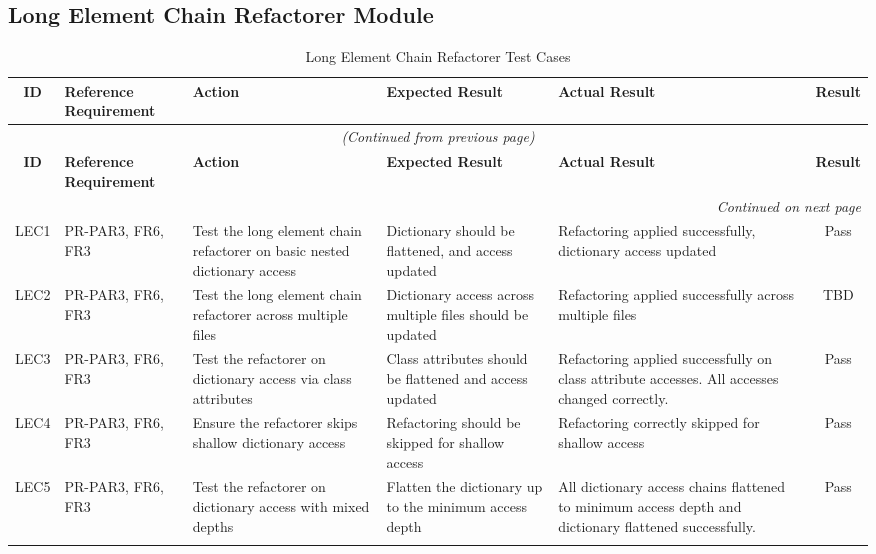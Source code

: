 \documentclass[12pt, titlepage]{article}
\begin{document}
\subsection{Long Element Chain Refactorer Module}

\begin{longtable}{|c|p{2.5cm}|p{3cm}|p{4cm}|p{2.5cm}|c|}
\hline
\textbf{ID} & \textbf{Reference Requirement} & \textbf{Action} & \textbf{Expected Result} & \textbf{Actual Result} & \textbf{Result} \\ \hline
\endfirsthead

\multicolumn{6}{c}{\textit{(Continued from previous page)}} \\ \hline
\textbf{ID} & \textbf{Reference Requirement} & \textbf{Action} & \textbf{Expected Result} & \textbf{Actual Result} & \textbf{Result} \\ \hline
\endhead

\hline \multicolumn{6}{|r|}{\textit{Continued on next page}} \\ \hline
\endfoot

\hline
\endlastfoot

LEC1 & PR-PAR3, FR6, FR3 & Test the long element chain refactorer on basic nested dictionary access & Dictionary should be flattened, and access updated & Refactoring applied successfully, dictionary access updated & \cellcolor{green!20} Pass \\ \hline
LEC2 & PR-PAR3, FR6, FR3 & Test the long element chain refactorer across multiple files & Dictionary access across multiple files should be updated & Refactoring applied successfully across multiple files & \cellcolor{yellow!20} TBD \\ \hline
LEC3 & PR-PAR3, FR6, FR3 & Test the refactorer on dictionary access via class attributes & Class attributes should be flattened and access updated & Refactoring applied successfully on class attribute accesses. All accesses changed correctly. & \cellcolor{green!20} Pass \\ \hline
LEC4 & PR-PAR3, FR6, FR3 & Ensure the refactorer skips shallow dictionary access & Refactoring should be skipped for shallow access & Refactoring correctly skipped for shallow access & \cellcolor{green!20} Pass \\ \hline
LEC5 & PR-PAR3, FR6, FR3 & Test the refactorer on dictionary access with mixed depths & Flatten the dictionary up to the minimum access depth & All dictionary access chains flattened to minimum access depth and dictionary flattened successfully. & \cellcolor{green!20} Pass \\ \hline

\caption{Long Element Chain Refactorer Test Cases}
\label{table:lec_refactorer_tests}
\end{longtable}
\end{document}
